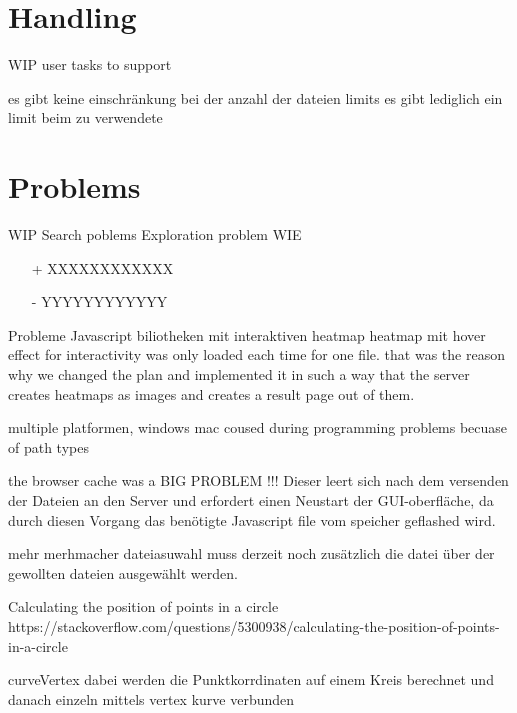 \documentclass[runningheads]{llncs}
\begin{document}
\newpage
\section{Handling}
WIP
user tasks to support

es gibt keine einschränkung bei der anzahl der dateien
limits 
es gibt lediglich ein limit beim zu verwendete



\newpage
\section{Problems}
WIP
Search poblems
Exploration problem
WIE
\begin{itemize}
    \item[+] XXXXXXXXXXXX
    \item[-] YYYYYYYYYYYY
\end{itemize}


Probleme
Javascript biliotheken mit interaktiven heatmap 
heatmap mit hover effect for interactivity was only loaded each time for one file. 
that was the reason why we changed the plan and implemented it in such a way that the server creates heatmaps as images and creates a result page out of them.

multiple platformen, windows mac coused during programming problems becuase of path types

the browser cache was a BIG PROBLEM !!! Dieser leert sich nach dem versenden der Dateien an den Server und erfordert einen Neustart der GUI-oberfläche, da durch diesen Vorgang das benötigte Javascript file vom speicher geflashed wird.


mehr merhmacher dateiasuwahl muss derzeit noch zusätzlich die datei über der gewollten dateien ausgewählt werden. 


Calculating the position of points in a circle
https://stackoverflow.com/questions/5300938/calculating-the-position-of-points-in-a-circle

curveVertex
dabei werden die Punktkorrdinaten auf einem Kreis berechnet und danach einzeln mittels vertex kurve verbunden


\end{document}
